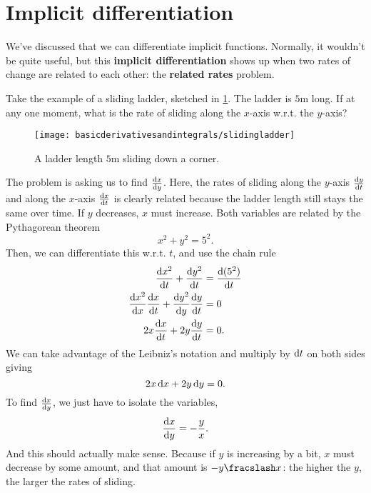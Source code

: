 \section{Implicit differentiation}

We've discussed that we can differentiate implicit functions. Normally, it wouldn't be quite useful, but this \textbf{implicit differentiation} shows up when two rates of change are related to each other: the \textbf{related rates} problem.

Take the example of a sliding ladder, sketched in \cref{fig:slidingladder}. The ladder is $5\unit{\meter}$ long. If at any one moment, what is the rate of sliding along the $x$-axis w.r.t. the $y$-axis?

\begin{figure}
    \centering
    \texttt{[image: basicderivativesandintegrals/slidingladder]}
    \caption{A ladder length $5\unit{\meter}$ sliding down a corner.}
    \label{fig:slidingladder}
\end{figure}

The problem is asking us to find $\odv{x}{y}$. Here, the rates of sliding along the $y$-axis $\odv{y}{t}$ and along the $x$-axis $\odv{x}{t}$ is clearly related because the ladder length still stays the same over time. If $y$ decreases, $x$ must increase. Both variables are related by the Pythagorean theorem
\begin{equation}
    x^2 + y^2 = 5^2.
\end{equation}
Then, we can differentiate this w.r.t. $t$, and use the chain rule
\begin{align*}
    \odv{x^2}{t} + \odv{y^2}{t} &= \odv{(5^2)}{t} \\
    \odv{x^2}{x}\odv{x}{t} + \odv{y^2}{y}\odv{y}{t} &= 0 \\
    2x\odv{x}{t} + 2y\odv{y}{t} &= 0.
\end{align*}
We can take advantage of the Leibniz's notation and multiply by $\odif{t}$ on both sides giving
\begin{equation*}
    2x\odif{x} + 2y\odif{y} = 0.
\end{equation*}
To find $\odv{x}{y}$, we just have to isolate the variables,
\begin{align*}
    \odv{x}{y} = -\frac{y}{x}.
\end{align*}
And this should actually make sense. Because if $y$ is increasing by a bit, $x$ must decrease by some amount, and that amount is $-\flatfrac{y}{x}$: the higher the $y$, the larger the rates of sliding.

